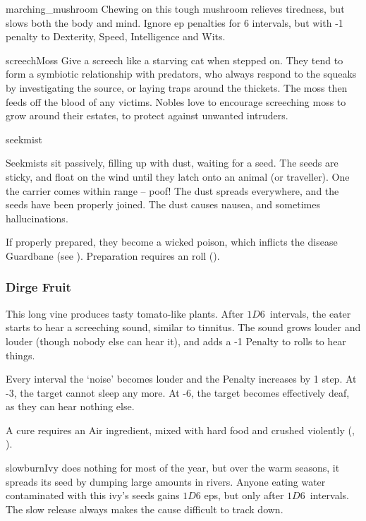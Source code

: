 \begin{multicols}{2}
%
  {marching_mushroom}%
  {
  Chewing on this tough mushroom relieves tiredness, but slows both the body and mind.
    Ignore \gls{ep} penalties for 6 \glspl{interval}, but with -1 penalty to Dexterity, Speed, Intelligence and Wits.
    }

%
  {screechMoss}%
  {
  Give a screech like a starving cat when stepped on.
  They tend to form a symbiotic relationship with predators, who always respond to the squeaks by investigating the source, or laying traps around the thickets.
  The moss then feeds off the blood of any victims.
  Nobles love to encourage screeching moss to grow around their estates, to protect against unwanted intruders.
    }

%
  {seekmist}%
  {Seekmists sit passively, filling up with dust, waiting for a seed.
  The seeds are sticky, and float on the wind until they latch onto an animal (or traveller).
  One the carrier comes within range -- poof!
  The dust spreads everywhere, and the seeds have been properly joined.
  The dust causes nausea, and sometimes hallucinations.

  If properly prepared, they become a wicked poison, which inflicts the disease Guardbane (see ).
  Preparation requires an  roll (\tn[12]).
    }

\subsubsection{Dirge Fruit}
\label{dirgeFruit}

This long vine produces tasty tomato-like plants.
After $1D6$~\glspl{interval}, the eater starts to hear a screeching sound, similar to tinnitus.
The sound grows louder and louder (though nobody else can hear it), and adds a -1 Penalty to rolls to hear things.

Every \gls{interval} the `noise' becomes louder and the Penalty increases by 1 step.
At -3, the target cannot sleep any more.
At -6, the target becomes effectively deaf, as they can hear nothing else.

A cure requires an Air \gls{ingredient}, mixed with hard food and crushed violently (, \tn[10]).

%
  {slowburnIvy}%
  {does nothing for most of the year, but over the warm seasons, it spreads its seed by dumping large amounts in rivers.
  Anyone eating water contaminated with this ivy's seeds gains $1D6$ \glspl{ep}, but only after $1D6$~\glspl{interval}.
  The slow release always makes the cause difficult to track down.
    }


\end{multicols}
